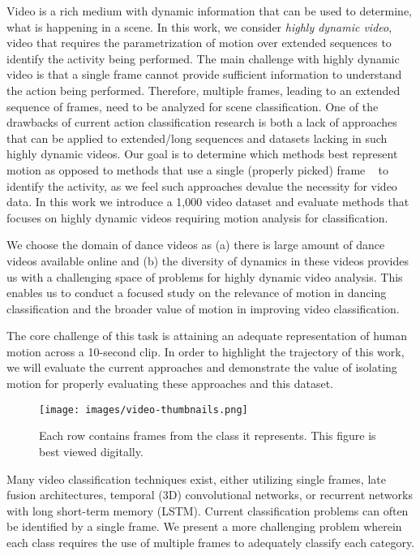 \documentclass[10pt,twocolumn,letterpaper]{article}
\begin{document}
Video is a rich medium with dynamic information that can be used to determine, what is happening in a scene. In this work, we consider \textsl{highly dynamic video}, video that requires the parametrization of motion over extended sequences to identify the activity being performed. The main challenge with highly dynamic video is that a single frame cannot provide sufficient information to understand the action being performed. Therefore, multiple frames, leading to an extended sequence of frames, need to be analyzed for scene classification. One of the drawbacks of current action classification research is both a lack of approaches that can be applied to extended/long sequences and datasets lacking in such highly dynamic videos. Our goal is to determine which methods best represent motion as opposed to methods that use a single (properly picked) frame ~\cite{feichtenhofer2016convolutional} to identify the activity, as we feel such approaches devalue the necessity for video data. In this work we introduce a 1,000 video dataset and evaluate methods that focuses on highly dynamic videos requiring motion analysis for classification.

We choose the domain of dance videos as (a) there is large amount of dance videos available online and (b) the diversity of dynamics in these videos provides us with a challenging space of problems for highly dynamic video analysis. This enables us to conduct a focused study on the relevance of motion in dancing classification and the broader value of motion in improving video classification.

The core challenge of this task is attaining an adequate representation of human motion across a 10-second clip. In order to highlight the trajectory of this work, we will evaluate the current approaches and demonstrate the value of isolating motion for properly evaluating these approaches and this dataset.

\begin{figure}[t]
	\texttt{[image: images/video-thumbnails.png]}
	\caption{\label{fig:videos}Each row contains frames from the class it represents. This figure is best viewed digitally.}
\end{figure}
Many video classification techniques exist, either utilizing single frames, late fusion architectures, temporal (3D) convolutional networks, or recurrent networks with long short-term memory (LSTM). Current classification problems can often be identified by a single frame. We present a more challenging problem wherein each class requires the use of multiple frames to adequately classify each category.
\end{document}
